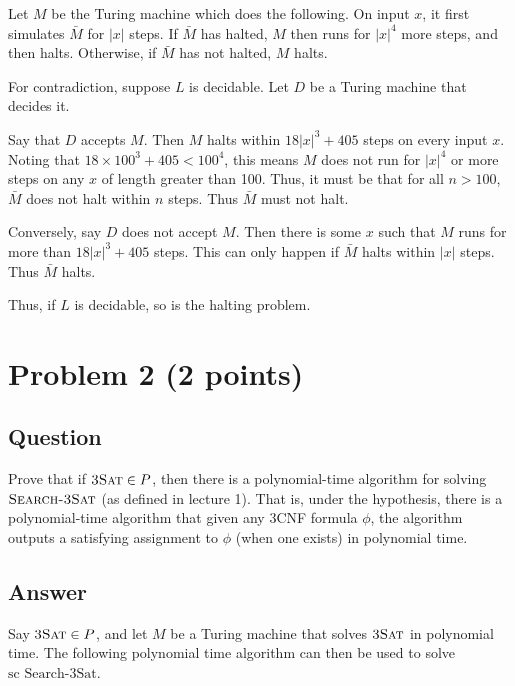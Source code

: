\documentclass{article}
\begin{document}
	Let $M$ be the Turing machine which does the following.  On input $x$, it first simulates $\bar{M}$ for $|x|$ steps.  If $\bar{M}$ has halted, $M$ then runs for $|x|^4$ more steps, and then halts.  Otherwise, if $\bar{M}$ has not halted, $M$ halts.

	For contradiction, suppose $L$ is decidable.  Let $D$ be a Turing machine that decides it.
	
	Say that $D$ accepts $M$.  Then $M$ halts within $18|x|^3 + 405$ steps on every input $x$.  Noting that $18 \times 100^3 + 405 < 100^4$, this means $M$ does not run for $|x|^4$ or more steps on any $x$ of length greater than 100.	Thus, it must be that for all $n > 100$, $\bar{M}$ does not halt within $n$ steps.  Thus $\bar{M}$ must not halt.

	Conversely, say $D$ does not accept $M$.  Then there is some $x$ such that $M$ runs for more than $18|x|^3 + 405$ steps.  This can only happen if $\bar{M}$ halts within $|x|$ steps.  Thus $\bar{M}$ halts.

	Thus, if $L$ is decidable, so is the halting problem.

    \section*{Problem 2 (2 points)}

	\subsection*{Question}

    Prove that if $\text{\sc 3Sat} \in P$, then there is a polynomial-time algorithm for solving $\text{\sc Search-3Sat}$ (as defined in lecture 1). That is, under the hypothesis, there is a polynomial-time algorithm that given any 3CNF formula $\phi$, the algorithm outputs a satisfying assignment to $\phi$ (when one exists) in polynomial time.
 
	\subsection*{Answer}


	Say $\text{\sc 3Sat} \in P$, and let $M$ be a Turing machine that solves $\text{\sc 3Sat}$ in polynomial time.  The following polynomial time algorithm can then be used to solve $\text{sc Search-3Sat}$.
\end{document}
